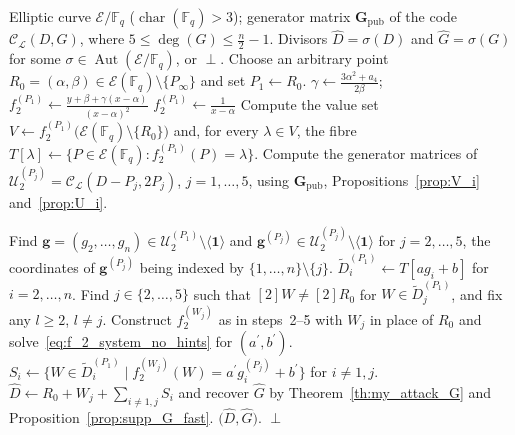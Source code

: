 \documentclass[sn-mathphys-num]{sn-jnl_modified}
\newcommand{\FF}{\ensuremath{\mathbb{F}}}
\begin{document}
\begin{algorithm}[H]
	\fontsize{9pt}{11pt}\selectfont
	\caption{Recovering an equivalent key $(\widehat{D}, \widehat{G})$ without known points}
	\label{alg:attack_no_hints}
	\begin{algorithmic}[1]
		\Require Elliptic curve $\mathcal{E}/\FF_q$ ($\operatorname{char}(\FF_q) > 3$); generator matrix $\mathbf{G}_{\operatorname{pub}}$ of the code $\mathcal{C}_\mathscr{L}(D,G)$, where $5 \leq \deg(G) \leq \frac{n}{2}-1$.
		\Ensure Divisors $\widehat{D} = \sigma(D)$ and $\widehat{G} = \sigma(G)$ for some $\sigma \in \operatorname{Aut}(\mathcal{E}/\FF_q)$, or $\perp$.
		\State Choose an arbitrary point $R_0 = (\alpha,\beta) \in \mathcal{E}(\FF_q) \setminus \{P_\infty\}$ and set $P_1 \gets R_0$.
		 
		\State $\gamma \gets \frac{3\alpha^2 + a_4}{2\beta}$;\quad $f_2^{(P_1)} \gets \frac{y + \beta + \gamma(x-\alpha)}{(x-\alpha)^2}$
		\Else
		\State $f_2^{(P_1)} \gets \frac{1}{x-\alpha}$ 
		\EndIf
		\State Compute the value set $V \gets f_2^{(P_1)}\bigl(\mathcal{E}(\FF_q)\setminus\{R_0\}\bigr)$ and, for every $\lambda \in V$, the fibre $T[\lambda] \gets \bigl\{P \in \mathcal{E}(\FF_q) : f_2^{(P_1)}(P) = \lambda\bigr\}$.
		\State Compute the generator matrices of $\mathcal{U}_2^{(P_j)} = \mathcal{C}_\mathscr{L}(D - P_j, 2P_j)$, $j = 1,\dots,5$, using $\mathbf{G}_{\operatorname{pub}}$, Propositions~\ref{prop:V_i} and~\ref{prop:U_i}.
        
		\State Find $\mathbf{g} = (g_2,\dots,g_n) \in \mathcal{U}_2^{(P_1)} \setminus \langle\mathbf{1}\rangle$
and $\mathbf{g}^{(P_j)} \in \mathcal{U}_2^{(P_j)} \setminus \langle\mathbf{1}\rangle$ for
$j = 2,\dots,5$, the coordinates of $\mathbf{g}^{(P_j)}$ being indexed by $\{1,\dots,n\}\setminus\{j\}$.
		\For{$(a,b) \in \FF_q^* \times \FF_q$}
		 
		\State $\widetilde{D}_i^{(P_1)} \gets T[a g_i + b]$ for $i = 2,\dots,n$.
		\State Find $j \in \{2,\dots,5\}$ such that $[2]W \neq [2]R_0$ for $W \in \widetilde{D}_j^{(P_1)}$, and fix any $l \geq 2$, $l \neq j$.
		\State Construct $f_2^{(W_j)}$ as in steps~2--5 with $W_j$ in place of $R_0$ and solve~\eqref{eq:f_2_system_no_hints} for $(a^\prime,b^\prime)$.
		\State $S_i \gets \bigl\{W \in \widetilde{D}_i^{(P_1)} \mid f_2^{(W_j)}(W) = a^\prime g^{(P_j)}_i + b^\prime\bigr\}$ for $i \neq 1,j$.
		\State $\widehat{D} \gets R_0 + W_j + \sum_{i \neq 1,j} S_i$ and recover $\widehat{G}$ by Theorem~\ref{th:my_attack_G} and Proposition~\ref{prop:supp_G_fast}.
		\State \Return $\bigl(\widehat{D}, \widehat{G}\bigr)$.
		\EndIf
		\EndFor
		\EndIf
		\EndFor
		\State \Return $\perp$
	\end{algorithmic}
\end{algorithm}
\end{document}
